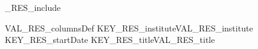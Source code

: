 %
\ifVAL_RES_include %
\begin{myTableEnv}{VAL_RES_columnsDef}%
    \myRow%
        {KEY_RES_institute}{VAL_RES_institute}%
        {KEY_RES_startDate}{}%
    \myRow%
        {}{}%
        {KEY_RES_title}{VAL_RES_title}%
\end{myTableEnv}%
%
\fi%
%
